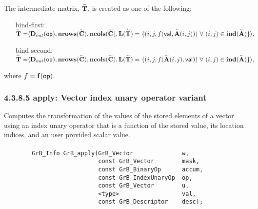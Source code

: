 The intermediate matrix, ${\bf \widetilde{T}}$, is created as one of the following:
\begin{itemize}[leftmargin=1.2in]
\item[bind-first:~~]
$
\begin{aligned}
{\bf \widetilde{T}} = & \langle \mbox{$\mathbf{D}_{out}$}({\sf op}),
                           \bold{nrows}({\bf \widetilde{C}}), 
                           \bold{ncols}({\bf \widetilde{C}}),  \bold{L}({\bf \widetilde{T}}) =
	\{(i,j,f({\sf val},{\bf \widetilde{A}}(i,j))) 
\ \forall \ (i,j) \in 
\bold{ind}({\bf \widetilde{A}}) \} \rangle,
\end{aligned}
$
\item[bind-second:~~]
$
\begin{aligned}
{\bf \widetilde{T}} = & \langle \mbox{$\mathbf{D}_{out}$}({\sf op}),
                           \bold{nrows}({\bf \widetilde{C}}), 
                           \bold{ncols}({\bf \widetilde{C}}),  \bold{L}({\bf \widetilde{T}}) =
	\{(i,j,f({\bf \widetilde{A}}(i,j),{\sf val})) 
\ \forall \ (i,j) \in 
\bold{ind}({\bf \widetilde{A}}) \} \rangle,
\end{aligned}
$
\end{itemize}
where $f = \mathbf{f}({\sf op})$.






\subsubsection*{4.3.8.5 {\sf apply}: Vector index unary operator variant}

Computes the transformation of the values of the stored elements of a vector
using an index unary operator that is a function of the stored value, its location 
indices, and an user provided scalar value.

\paragraph{\syntax}

\begin{verbatim}
        GrB_Info GrB_apply(GrB_Vector              w,
                           const GrB_Vector        mask,
                           const GrB_BinaryOp      accum,
                           const GrB_IndexUnaryOp  op,
                           const GrB_Vector        u,
                           <type>                  val,
                           const GrB_Descriptor    desc);
\end{verbatim}

